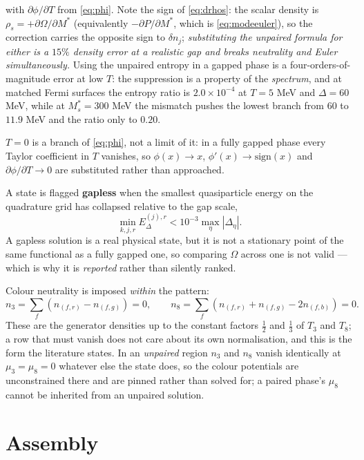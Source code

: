 \documentclass[11pt,a4paper]{article}
\newcommand{\Mstar}{M^{*}}
\begin{document}
with $\partial\phi/\partial T$ from \eqref{eq:phi}. Note the sign of
\eqref{eq:drhos}: the scalar density is $\rho_s=+\partial\Omega/\partial\Mstar$
(equivalently $-\partial P/\partial\Mstar$, which is \eqref{eq:modeeuler}), so
the correction carries the opposite sign to $\delta n_j$; \emph{substituting
the unpaired formula for either is a $15\%$ density error at a realistic gap
and breaks neutrality and Euler simultaneously.} Using the unpaired entropy in
a gapped phase is a four-orders-of-magnitude error at low $T$: the suppression
is a property of the \emph{spectrum}, and at matched Fermi surfaces the entropy
ratio is $2.0\times10^{-4}$ at $T=5$ MeV and $\Delta=60$ MeV, while at
$\Mstar_s=300$ MeV the mismatch pushes the lowest branch from $60$ to $11.9$
MeV and the ratio only to $0.20$.

$T=0$ is a branch of \eqref{eq:phi}, not a limit of it: in a fully gapped phase
every Taylor coefficient in $T$ vanishes, so
$\phi(x)\to x$, $\phi'(x)\to\mathrm{sign}(x)$ and $\partial\phi/\partial T\to0$
are substituted rather than approached.

A state is flagged \textbf{gapless} when the smallest quasiparticle energy on
the quadrature grid has collapsed relative to the gap scale,
\begin{equation}
\min_{k,j,r} E^{(j),r}_\Delta < 10^{-3}\max_\eta\left|\Delta_\eta\right| .
\label{eq:gapless}
\end{equation}
A gapless solution is a real physical state, but it is not a stationary point
of the same functional as a fully gapped one, so comparing $\Omega$ across one
is not valid --- which is why it is \emph{reported} rather than silently
ranked.

Colour neutrality is imposed \emph{within} the pattern:
\begin{equation}
n_3 = \sum_f\left(n_{(f,r)}-n_{(f,g)}\right)=0,
\qquad
n_8 = \sum_f\left(n_{(f,r)}+n_{(f,g)}-2 n_{(f,b)}\right)=0 .
\label{eq:colour}
\end{equation}
These are the generator densities up to the constant factors $\tfrac12$ and
$\tfrac13$ of $T_3$ and $T_8$; a row that must vanish does not care about its
own normalisation, and this is the form the literature states. In an
\emph{unpaired} region $n_3$ and $n_8$ vanish identically at $\mu_3=\mu_8=0$
whatever else the state does, so the colour potentials are unconstrained there
and are pinned rather than solved for; a paired phase's $\mu_8$ cannot be
inherited from an unpaired solution.

\section{Assembly}
\label{sec:assembly}
\end{document}
